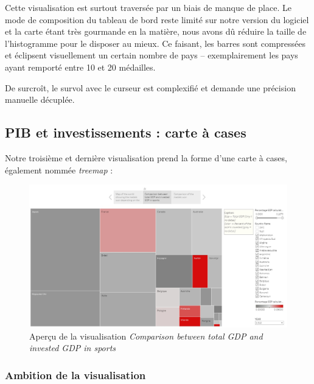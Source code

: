 \documentclass[hidelinks, 12pt]{report}
\begin{document}
Cette visualisation est surtout traversée par un biais de manque de place. Le mode de composition du tableau de bord reste limité sur notre version du logiciel et la carte étant très gourmande en la matière, nous avons dû réduire la taille de l'histogramme pour le disposer au mieux. Ce faisant, les barres sont compressées et éclipsent visuellement un certain nombre de pays -- exemplairement les pays ayant remporté entre 10 et 20 médailles. 

De surcroît, le survol avec le curseur est complexifié et demande une précision manuelle décuplée.





%





\subsection{PIB et investissements : carte à cases}

Notre troisième et dernière visualisation prend la forme d'une carte à cases, également nommée \textit{treemap} :

\begin{center}
	\begin{figure}[H]
		\centering
		\setlength{\abovecaptionskip}{-15pt}
		\setlength{\belowcaptionskip}{-35pt}
		\includegraphics[scale=0.3]{images/datavis-medals-world-treemap.jpeg}
		\caption{Aperçu de la visualisation \textit{Comparison between total GDP and invested GDP in sports}}
	\end{figure}
\end{center}

\subsubsection{Ambition de la visualisation}
\end{document}
